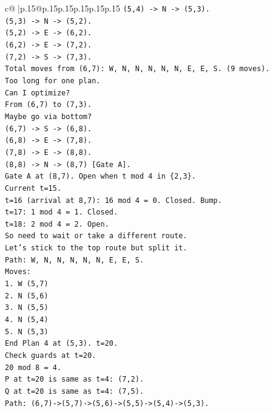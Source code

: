 \documentclass{article}
\begin{document}
{\begin{supertabular}{c@{$\;$}|p{.15\linewidth}@{}p{.15\linewidth}p{.15\linewidth}p{.15\linewidth}p{.15\linewidth}p{.15\linewidth}}
{{{\texttt{(5,4) {-}> N {-}> (5,3).} \\
\texttt{(5,3) {-}> N {-}> (5,2).} \\
\texttt{(5,2) {-}> E {-}> (6,2).} \\
\texttt{(6,2) {-}> E {-}> (7,2).} \\
\texttt{(7,2) {-}> S {-}> (7,3).} \\
\texttt{Total moves from (6,7): W, N, N, N, N, N, E, E, S. (9 moves).} \\
\texttt{Too long for one plan.} \\
\texttt{Can I optimize?} \\
\texttt{From (6,7) to (7,3).} \\
\texttt{Maybe go via bottom?} \\
\texttt{(6,7) {-}> S {-}> (6,8).} \\
\texttt{(6,8) {-}> E {-}> (7,8).} \\
\texttt{(7,8) {-}> E {-}> (8,8).} \\
\texttt{(8,8) {-}> N {-}> (8,7) {[}Gate A{]}.} \\
\texttt{Gate A at (8,7). Open when t mod 4 in \{2,3\}.} \\
\texttt{Current t=15.} \\
\texttt{t=16 (arrival at 8,7): 16 mod 4 = 0. Closed. Bump.} \\
\texttt{t=17: 1 mod 4 = 1. Closed.} \\
\texttt{t=18: 2 mod 4 = 2. Open.} \\
\texttt{So need to wait or take a different route.} \\
\texttt{Let's stick to the top route but split it.} \\
\texttt{Path: W, N, N, N, N, N, E, E, S.} \\
\texttt{Moves:} \\
\texttt{1. W (5,7)} \\
\texttt{2. N (5,6)} \\
\texttt{3. N (5,5)} \\
\texttt{4. N (5,4)} \\
\texttt{5. N (5,3)} \\
\texttt{End Plan 4 at (5,3). t=20.} \\
\texttt{Check guards at t=20.} \\
\texttt{20 mod 8 = 4.} \\
\texttt{P at t=20 is same as t=4: (7,2).} \\
\texttt{Q at t=20 is same as t=4: (7,5).} \\
\texttt{Path: (6,7){-}>(5,7){-}>(5,6){-}>(5,5){-}>(5,4){-}>(5,3).} \\
}}}
\end{supertabular}}
\end{document}
